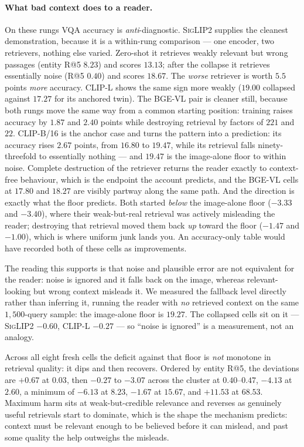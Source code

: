 \paragraph{What bad context does to a reader.} On these rungs VQA accuracy is \emph{anti}-diagnostic. \textsc{SigLIP2} supplies the cleanest demonstration, because it is a
within-rung comparison --- one encoder, two retrievers, nothing else varied. Zero-shot it
retrieves weakly relevant but wrong passages (entity R@5 $8.23$) and scores $13.13$; after the
collapse it retrieves essentially noise (R@5 $0.40$) and scores $18.67$. The \emph{worse}
retriever is worth $5.5$ points \emph{more} accuracy. \textsc{CLIP-L} shows the same sign more
weakly ($19.00$ collapsed against $17.27$ for its anchored twin). The \textsc{BGE-VL} pair is
cleaner still, because both rungs move the same way from a common starting position: training
raises accuracy by $1.87$ and $2.40$ points while destroying retrieval by factors of $221$ and
$22$. \textsc{CLIP-B/16} is the anchor case and turns the pattern into a prediction: its accuracy
rises $2.67$ points, from $16.80$ to $19.47$, while its retrieval falls ninety-threefold to
essentially nothing --- and $19.47$ is the image-alone floor to within noise. Complete destruction
of the retriever returns the reader exactly to context-free behaviour, which is the endpoint the
account predicts, and the \textsc{BGE-VL} cells at $17.80$ and $18.27$ are visibly partway along
the same path. And the direction is exactly what the floor predicts. Both started \emph{below} the
image-alone floor ($-3.33$ and $-3.40$), where their weak-but-real retrieval was actively
misleading the reader; destroying that retrieval moved them back \emph{up} toward the floor
($-1.47$ and $-1.00$), which is where uniform junk lands you. An accuracy-only table would have
recorded both of these cells as improvements.

The reading this supports is that noise and plausible error are not equivalent for the reader:
noise is ignored and it falls back on the image, whereas relevant-looking but wrong context
misleads it. We measured the fallback level directly rather than inferring it, running the reader
with \emph{no} retrieved context on the same $1{,}500$-query sample: the image-alone floor is
$19.27$. The collapsed cells sit on it --- \textsc{SigLIP2} $-0.60$, \textsc{CLIP-L} $-0.27$ ---
so ``noise is ignored'' is a measurement, not an analogy.

Across all eight fresh cells the deficit against that floor is \emph{not} monotone in retrieval
quality: it dips and then recovers. Ordered by entity R@5, the deviations are
$+0.67$ at $0.03$, then $-0.27$ to $-3.07$ across the cluster at $0.40$--$0.47$, $-4.13$ at
$2.60$, a minimum of $-6.13$ at $8.23$, $-1.67$ at $15.67$, and $+11.53$ at $68.53$. Maximum harm
sits at weak-but-credible relevance and reverses as genuinely useful retrievals start to
dominate, which is the shape the mechanism predicts: context must be relevant enough to be
believed before it can mislead, and past some quality the help outweighs the misleads.

